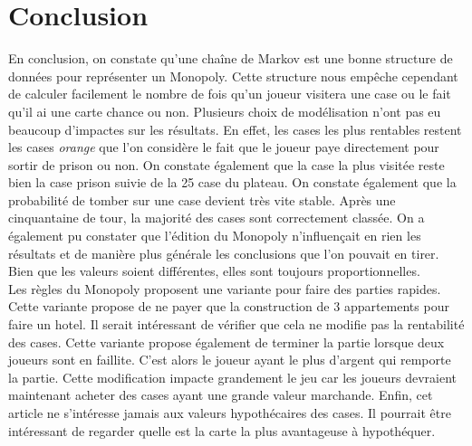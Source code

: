 \documentclass[letterpaper]{article}
\begin{document}
\section{Conclusion}
  En conclusion, on constate qu'une chaîne de Markov est une bonne
  structure de données pour représenter un Monopoly.  Cette structure
  nous empêche cependant de calculer facilement le nombre de fois
  qu'un joueur visitera une case ou le fait qu'il ai une carte chance ou non.
  Plusieurs choix de modélisation n'ont pas eu beaucoup d'impactes
  sur les résultats.  En effet, les cases les plus rentables restent les 
  cases \textit{orange} que l'on considère le fait que le joueur paye
  directement pour sortir de prison ou non.  On constate également que
  la case la plus visitée reste bien la case prison suivie de la 25
  case du plateau.  On constate également que la probabilité de tomber sur
  une case devient très vite stable.  Après une cinquantaine de tour, la
  majorité des cases sont correctement classée.  On a également pu 
  constater que l'édition du Monopoly n'influençait en rien les résultats
  et de manière plus générale les conclusions que l'on pouvait en tirer.
  Bien que les valeurs soient différentes, elles sont toujours 
  proportionnelles.\\
  Les règles du Monopoly proposent une variante pour faire des parties
  rapides.  Cette variante propose de ne payer que la construction de 3 
  appartements pour faire un hotel.  Il serait intéressant de vérifier que
  cela ne modifie pas la rentabilité des cases. Cette variante propose
  également de terminer la partie lorsque deux joueurs sont en faillite.
  C'est alors le joueur ayant le plus d'argent qui remporte la partie.
  Cette modification impacte grandement le jeu car les joueurs devraient
  maintenant acheter des cases ayant une grande valeur marchande.  Enfin,
  cet article ne s'intéresse jamais aux valeurs hypothécaires des cases. 
  Il pourrait être intéressant de regarder quelle est la carte la plus 
  avantageuse à hypothéquer.
  
  
\footnotesize
\nocite{*}




\newpage
\appendix
  \onecolumn
\end{document}

